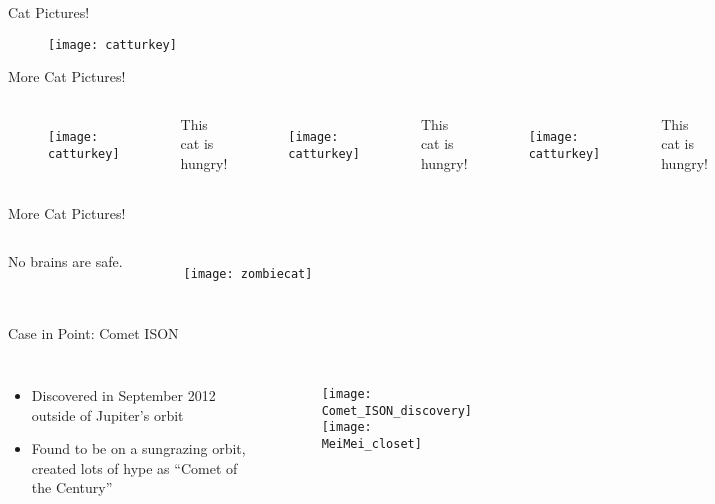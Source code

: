 \documentclass{beamer}
\begin{document}
\begin{frame}{Cat Pictures!}
 \begin{figure}
\texttt{[image: catturkey]}  
\end{figure}
\end{frame}

\begin{frame}{More Cat Pictures!}
\begin{columns}
\begin{figure}
\texttt{[image: catturkey]}  
\end{figure}
\large{This cat is hungry!}
\begin{figure}
\texttt{[image: catturkey]}  
\end{figure}
\footnotesize{This cat is hungry!}
\begin{figure}
\texttt{[image: catturkey]}  
\end{figure}
\huge{This cat is hungry!}
\begin{figure}
\texttt{[image: catturkey]}  
\end{figure}
\tiny{This cat is hungry!}
\end{columns}
\end{frame}

\begin{frame}{More Cat Pictures!}
\begin{columns}
No brains are safe.
\begin{figure}
\texttt{[image: zombiecat]}  
\end{figure}
\end{columns}
\end{frame}

\begin{frame}{Case in Point: Comet ISON}
\begin{columns}
\begin{itemize}
 \item Discovered in September 2012 outside of Jupiter's orbit
 \item Found to be on a sungrazing orbit, created lots of hype as ``Comet of the Century''
\end{itemize}
\begin{figure}
 \texttt{[image: Comet\_ISON\_discovery]}\\
 \texttt{[image: MeiMei\_closet]}
\end{figure}
\end{columns}
\end{frame}
\end{document}
